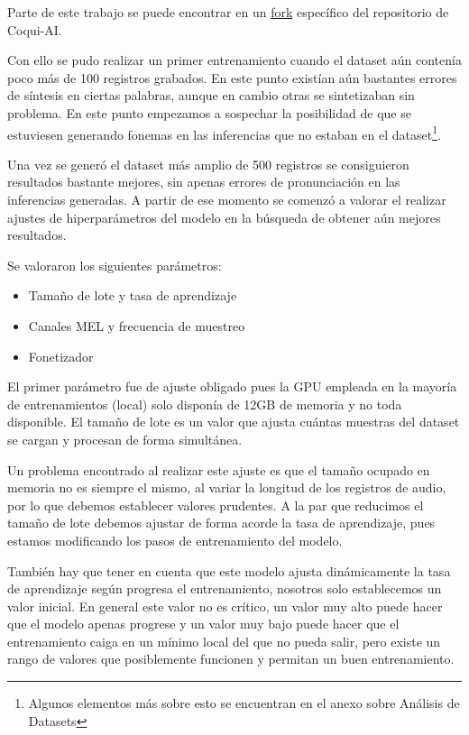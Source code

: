 Parte de este trabajo se puede encontrar en un \href{https://github.com/daniel-dona/coqui-ai-TTS}{fork} específico del repositorio de Coqui-AI.

Con ello se pudo realizar un primer entrenamiento cuando el dataset aún contenía poco más de 100 registros grabados. En este punto existían aún bastantes errores de síntesis en ciertas palabras, aunque en cambio otras se sintetizaban sin problema. En este punto empezamos a sospechar la posibilidad de que se estuviesen generando fonemas en las inferencias que no estaban en el dataset\footnote{Algunos elementos más sobre esto se encuentran en el anexo sobre Análisis de Datasets}.

Una vez se generó el dataset más amplio de 500 registros se consiguieron resultados bastante mejores, sin apenas errores de pronunciación en las inferencias generadas. A partir de ese momento se comenzó a valorar el realizar ajustes de hiperparámetros del modelo en la búsqueda de obtener aún mejores resultados.

Se valoraron los siguientes parámetros:

\begin{itemize}
    \item Tamaño de lote y tasa de aprendizaje
    \item Canales MEL y frecuencia de muestreo
    \item Fonetizador
\end{itemize}

El primer parámetro fue de ajuste obligado pues la GPU empleada en la mayoría de entrenamientos (local) solo disponía de 12GB de memoria y no toda disponible. El tamaño de lote es un valor que ajusta cuántas muestras del dataset se cargan y procesan de forma simultánea.

Un problema encontrado al realizar este ajuste es que el tamaño ocupado en memoria no es siempre el mismo, al variar la longitud de los registros de audio, por lo que debemos establecer valores prudentes. A la par que reducimos el tamaño de lote debemos ajustar de forma acorde la tasa de aprendizaje, pues estamos modificando los pasos de entrenamiento del modelo.

También hay que tener en cuenta que este modelo ajusta dinámicamente la tasa de aprendizaje según progresa el entrenamiento, nosotros solo establecemos un valor inicial. En general este valor no es crítico, un valor muy alto puede hacer que el modelo apenas progrese y un valor muy bajo puede hacer que el entrenamiento caiga en un mínimo local del que no pueda salir, pero existe un rango de valores que posiblemente funcionen y permitan un buen entrenamiento.

